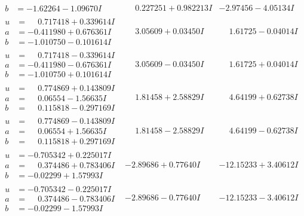 \documentclass[1p]{elsarticle_modified}
\theoremstyle{definition}
\begin{document}
$$\begin{array}{c|c|c}
\begin{aligned}
b &= -1.62264 - 1.09670 I\end{aligned}
 & \phantom{-}0.227251 + 0.982213 I & -2.97456 - 4.05134 I \\ \hline\begin{aligned}
u &= \phantom{-}0.717418 + 0.339614 I \\
a &= -0.411980 + 0.676361 I \\
b &= -1.010750 - 0.101614 I\end{aligned}
 & \phantom{-}3.05609 + 0.03450 I & \phantom{-}1.61725 - 0.04014 I \\ \hline\begin{aligned}
u &= \phantom{-}0.717418 - 0.339614 I \\
a &= -0.411980 - 0.676361 I \\
b &= -1.010750 + 0.101614 I\end{aligned}
 & \phantom{-}3.05609 - 0.03450 I & \phantom{-}1.61725 + 0.04014 I \\ \hline\begin{aligned}
u &= \phantom{-}0.774869 + 0.143809 I \\
a &= \phantom{-}0.06554 - 1.56635 I \\
b &= \phantom{-}0.115818 - 0.297169 I\end{aligned}
 & \phantom{-}1.81458 + 2.58829 I & \phantom{-}4.64199 + 0.62738 I \\ \hline\begin{aligned}
u &= \phantom{-}0.774869 - 0.143809 I \\
a &= \phantom{-}0.06554 + 1.56635 I \\
b &= \phantom{-}0.115818 + 0.297169 I\end{aligned}
 & \phantom{-}1.81458 - 2.58829 I & \phantom{-}4.64199 - 0.62738 I \\ \hline\begin{aligned}
u &= -0.705342 + 0.225017 I \\
a &= \phantom{-}0.374486 + 0.783406 I \\
b &= -0.02299 + 1.57993 I\end{aligned}
 & -2.89686 + 0.77640 I & -12.15233 + 3.40612 I \\ \hline\begin{aligned}
u &= -0.705342 - 0.225017 I \\
a &= \phantom{-}0.374486 - 0.783406 I \\
b &= -0.02299 - 1.57993 I\end{aligned}
 & -2.89686 - 0.77640 I & -12.15233 - 3.40612 I \\ \hline\begin{aligned}

\end{aligned}
\end{array}$$
\end{document}
